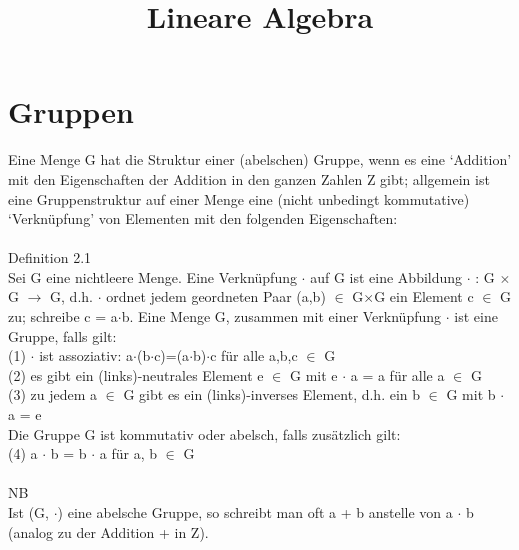 \documentclass[fontsize=10pt]{scrartcl}
\title{Lineare Algebra}
\author{}
\date{}
\begin{document}

\maketitle
\setcounter{section}{1}

\section{Gruppen}
Eine Menge G hat die Struktur einer (abelschen) Gruppe, wenn es eine ‘Addition’ mit den Eigenschaften der Addition in den ganzen Zahlen Z gibt; allgemein ist eine Gruppenstruktur auf einer Menge eine (nicht unbedingt kommutative) ‘Verknüpfung’ von Elementen mit den folgenden Eigenschaften: \\
\\
Definition 2.1\\
Sei G eine nichtleere Menge. Eine Verknüpfung $\cdot$ auf G ist eine Abbildung $\cdot$ : G $\times$ G $\to$ G, d.h. $\cdot$ ordnet jedem geordneten Paar (a,b) $\in$ G$\times$G ein Element c $\in$ G zu; schreibe c = a$\cdot$b. Eine Menge G, zusammen mit einer Verknüpfung $\cdot$ ist eine Gruppe, falls gilt: \\
(1) $\cdot$ ist assoziativ: a$\cdot$(b$\cdot$c)=(a$\cdot$b)$\cdot$c für alle a,b,c $\in$ G\\
(2) es gibt ein (links)-neutrales Element e $\in$ G mit e $\cdot$ a = a für alle a $\in$ G \\
(3) zu jedem a $\in$ G gibt es ein (links)-inverses Element, d.h. ein b $\in$ G mit b $\cdot$ a = e \\
Die Gruppe G ist kommutativ oder abelsch, falls zusätzlich gilt: \\
(4) a $\cdot$ b = b $\cdot$ a für a, b $\in$ G\\ 
\\
NB\\
Ist (G, $\cdot$) eine abelsche Gruppe, so schreibt man oft a + b anstelle von a $\cdot$ b (analog zu der Addition + in Z).
\end{document}
